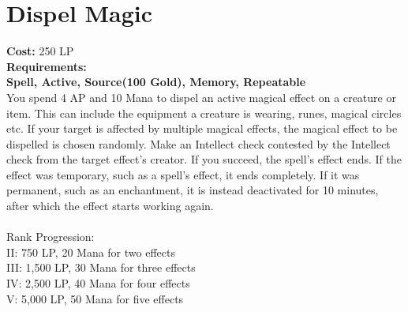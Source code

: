 \section{Dispel Magic}\label{spell:dispelMagic}
\textbf{Cost:} 250 LP\\
\textbf{Requirements:}\\
\textbf{Spell, Active, Source(100 Gold), Memory, Repeatable}\\
You spend 4 AP and 10 Mana to dispel an active magical effect on a creature or item.
This can include the equipment a creature is wearing, runes, magical circles etc.
If your target is affected by multiple magical effects, the magical effect to be dispelled is chosen randomly.
Make an Intellect check contested by the Intellect check from the target effect's creator.
If you succeed, the spell's effect ends.
If the effect was temporary, such as a spell's effect, it ends completely.
If it was permanent, such as an enchantment, it is instead deactivated for 10 minutes, after which the effect starts working again.\\
\\
Rank Progression:\\
II: 750 LP, 20 Mana for two effects\\
III: 1,500 LP, 30 Mana for three effects\\
IV: 2,500 LP, 40 Mana for four effects\\
V: 5,000 LP, 50 Mana for five effects\\